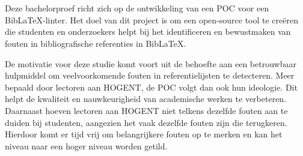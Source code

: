 
%
%
%
%
%

%



\chapter*{}

Deze bachelorproef richt zich op de ontwikkeling van een \acrfull{POC} voor een BibLaTeX-linter. Het doel van dit project is om een open-source tool te creëren die studenten en onderzoekers helpt bij het identificeren en bewustmaken van fouten in bibliografische referenties in BibLaTeX.

De motivatie voor deze studie komt voort uit de behoefte aan een betrouwbaar hulpmiddel om veelvoorkomende fouten in referentielijsten te detecteren. Meer bepaald door lectoren aan HOGENT, de \acrlong{POC} volgt dan ook hun ideologie. Dit helpt de kwaliteit en nauwkeurigheid van academische werken te verbeteren. Daarnaast hoeven lectoren aan HOGENT niet telkens dezelfde fouten aan te duiden bij studenten, aangezien het vaak dezelfde fouten zijn die terugkeren. Hierdoor komt er tijd vrij om belangrijkere fouten op te merken en kan het niveau naar een hoger niveau worden getild.

